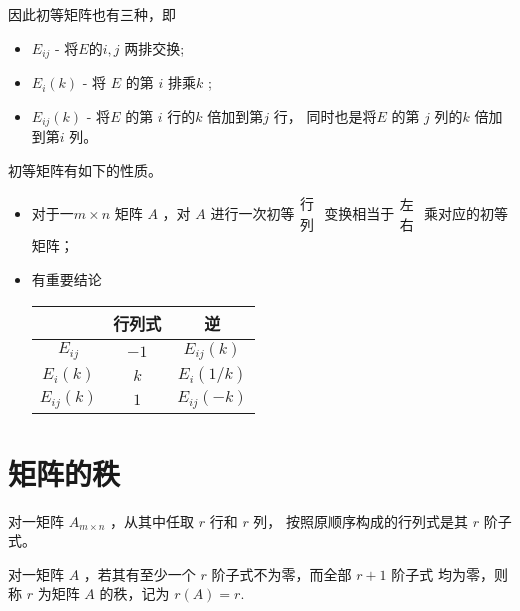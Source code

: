 因此初等矩阵也有三种，即
\begin{itemize}
    \item $ E_{ij} $ - 将$ E $的$ i,j $ 两排交换;
    \item $ E_{i}(k) $ - 将 $ E $ 的第 $ i $ 排乘$ k $ ;
    \item $ E_{ij}(k) $ - 将$ E $ 的第 $ i $ 行的$ k $ 倍加到第$ j $ 行，
    同时也是将$ E $ 的第 $ j $ 列的$ k $ 倍加到第$ i $ 列。
\end{itemize}

初等矩阵有如下的性质。
\begin{itemize}
    \item 对于一$ m\times n $ 矩阵 $ A $ ，对 $ A $ 进行一次初等$ \begin{matrix}
        \textrm{行}\\\textrm{列}
    \end{matrix} $ 变换相当于$ \begin{matrix}
        \textrm{左}\\\textrm{右}
    \end{matrix} $ 乘对应的初等矩阵；
    \item 有重要结论
        \begin{table}[!htbp]\centering
            \begin{tabular}{|c|c|c|}
            \hline
                        & 行列式 & 逆                   \\ \hline
            $ E_{ij} $    & $ -1 $   & $ E_{ij}(k) $       \\ \hline
            $ E_{i}(k) $  & $ k  $   & $ E_{i}(1/k) $ \\ \hline
            $ E_{ij}(k) $ & $ 1  $   & $ E_{ij}(-k) $      \\ \hline
            \end{tabular}
        \end{table}
\end{itemize}

\section{矩阵的秩}

\begin{Def}[$ r $ 阶子式]

    对一矩阵 $ A_{m\times n} $ ，从其中任取 $ r $ 行和 $ r $ 列，
    按照原顺序构成的行列式是其 $ r $ 阶子式。    
\end{Def}

\begin{Def}[矩阵的秩]

    对一矩阵 $ A $ ，若其有至少一个 $ r $ 阶子式不为零，而全部 $ r+1 $ 阶子式
    均为零，则称 $ r $ 为矩阵 $ A $ 的秩，记为 $ r(A) = r $.
\end{Def}

